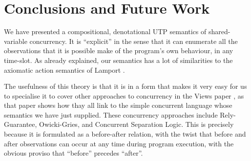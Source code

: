 \section{Conclusions and Future Work}\label{sec:conc}

We have presented a compositional, denotational UTP semantics
of shared-variable concurrency.
It is ``explicit'' in the sense that it can enumerate all the observations
that it is possible make of the program's own behaviour, in any time-slot.
As already explained, our semantics has a lot of similarities to the axiomatic action semantics of Lamport \cite{Lamport1985}.

The usefulness of this theory is that it is in a form that makes it very
easy for us to specialise it to cover
other approaches to concurrency in the Views paper \cite{conf/popl/Dinsdale-YoungBGPY13},
as that paper shows how thay all link to the simple concurrent language whose semantics we have just supplied.
These concurrency approaches include Rely-Guarantee\cite{DBLP:phd/ethos/Jones81,On-RG:vanStaden15},
Owicki-Gries\cite{DBLP:journals/acta/OwickiG76}, and
Concurrent Separation Logic\cite{DBLP:journals/entcs/Brookes11}.
This is precisely because it is formulated as a before-after relation,
with the twist that before and after observations can occur at any time
during program execution, with the obvious proviso that
``before'' precedes ``after''.


